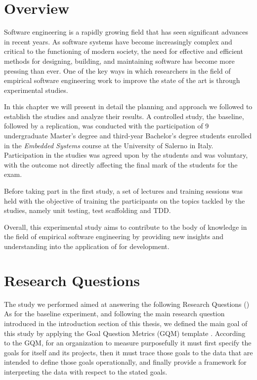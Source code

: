 \section{Overview}
Software engineering is a rapidly growing field that has seen significant advances in recent years. As software systems have become increasingly complex and critical to the functioning of modern society, the need for effective and efficient methods for designing, building, and maintaining software has become more pressing than ever. One of the key ways in which researchers in the field of empirical software engineering work to improve the state of the art is through experimental studies.

In this chapter we will present in detail the planning and approach we followed to establish the studies and analyze their results. 
A controlled study, the baseline, followed by a replication, was conducted with the participation of 9 undergraduate Master's degree and third-year Bachelor's degree students enrolled in the \textit{Embedded Systems} course at the University of Salerno in Italy. Participation in the studies was agreed upon by the students and was voluntary, with the outcome not directly affecting the final mark of the students for the exam.

Before taking part in the first study, a set of lectures and training sessions was held with the objective of training the participants on the topics tackled by the studies, namely unit testing, test scaffolding and TDD.

Overall, this experimental study aims to contribute to the body of knowledge in the field of empirical software engineering by providing new insights and understanding into the application of \tdd for \es development.



\section{Research Questions}
The study we performed aimed at answering the following Research Questions (\rqs)
As for the baseline experiment, and following the main research question introduced in the introduction section of this thesis, we defined the main goal of this study by applying the Goal Question Metrics (GQM) template \cite{GQM}.
According to the GQM, for an organization to measure purposefully it must first specify the goals for itself and its projects, then it must trace those goals to the data that are intended to define those goals operationally, and finally provide a framework for interpreting the data with respect to the stated goals.

